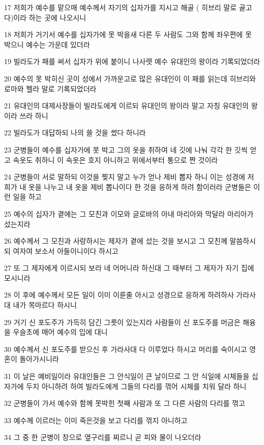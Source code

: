 \par 17 저희가 예수를 맡으매 예수께서 자기의 십자가를 지시고 해골 ( 히브리 말로 골고다)이라 하는 곳에 나오시니
\par 18 저희가 거기서 예수를 십자가에 못 박을새 다른 두 사람도 그와 함께 좌우편에 못 박으니 예수는 가운데 있더라
\par 19 빌라도가 패를 써서 십자가 위에 붙이니 나사렛 예수 유대인의 왕이라 기록되었더라
\par 20 예수의 못 박히신 곳이 성에서 가까운고로 많은 유대인이 이 패를 읽는데 히브리와 로마와 헬라 말로 기록되었더라
\par 21 유대인의 대제사장들이 빌라도에게 이르되 유대인의 왕이라 말고 자칭 유대인의 왕이라 쓰라 하니
\par 22 빌라도가 대답하되 나의 쓸 것을 썼다 하니라
\par 23 군병들이 예수를 십자가에 못 박고 그의 옷을 취하여 네 깃에 나눠 각각 한 깃씩 얻고 속옷도 취하니 이 속옷은 호지 아니하고 위에서부터 통으로 짠 것이라
\par 24 군병들이 서로 말하되 이것을 찢지 말고 누가 얻나 제비 뽑자 하니 이는 성경에 저희가 내 옷을 나누고 내 옷을 제비 뽑나이다 한 것을 응하게 하려 함이러라 군병들은 이런 일을 하고
\par 25 예수의 십자가 곁에는 그 모친과 이모와 글로바의 아내 마리아와 막달라 마리아가 섰는지라
\par 26 예수께서 그 모친과 사랑하시는 제자가 곁에 섰는 것을 보시고 그 모친께 말씀하시되 여자여 보소서 아들이니이다 하시고
\par 27 또 그 제자에게 이르시되 보라 네 어머니라 하신대 그 때부터 그 제자가 자기 집에 모시니라
\par 28 이 후에 예수께서 모든 일이 이미 이룬줄 아시고 성경으로 응하게 하려하사 가라사대 내가 목마르다 하시니
\par 29 거기 신 포도주가 가득히 담긴 그릇이 있는지라 사람들이 신 포도주를 머금은 해융을 우슬초에 매어 예수의 입에 대니
\par 30 예수께서 신 포도주를 받으신 후 가라사대 다 이루었다 하시고 머리를 숙이시고 영혼이 돌아가시니라
\par 31 이 날은 예비일이라 유대인들은 그 안식일이 큰 날이므로 그 안 식일에 시체들을 십자가에 두지 아니하려 하여 빌라도에게 그들의 다리를 꺾어 시체를 치워 달라 하니
\par 32 군병들이 가서 예수와 함께 못박힌 첫째 사람과 또 그 다른 사람의 다리를 꺾고
\par 33 예수께 이르러는 이미 죽은것을 보고 다리를 꺾지 아니하고
\par 34 그 중 한 군병이 창으로 옆구리를 찌르니 곧 피와 물이 나오더라
